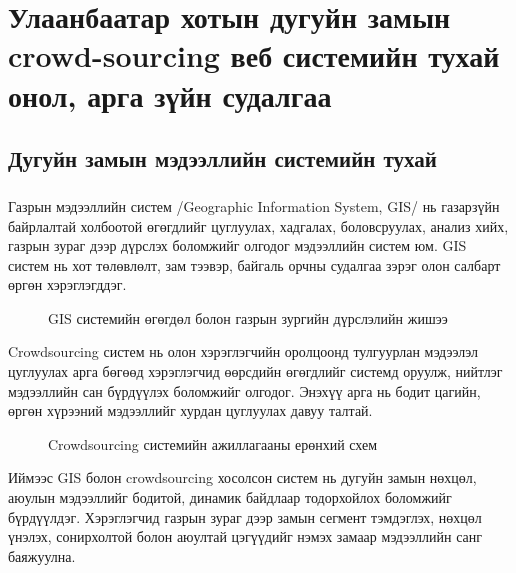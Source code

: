 \chapter{Улаанбаатар хотын дугуйн замын crowd-sourcing веб системийн тухай онол, арга зүйн судалгаа} %
\label{Chapter1} %
\newcommand{\keyword}[1]{\textbf{#1}}
\newcommand{\tabhead}[1]{\textbf{#1}}
\newcommand{\code}[1]{\texttt{#1}}
\newcommand{\file}[1]{\texttt{\bfseries#1}}
\newcommand{\option}[1]{\texttt{\itshape#1}}
\section{Дугуйн замын мэдээллийн системийн тухай}
\paragraph{}
Газрын мэдээллийн систем /Geographic Information System, GIS/ нь газарзүйн байрлалтай холбоотой өгөгдлийг цуглуулах, хадгалах, боловсруулах, анализ хийх, газрын зураг дээр дүрслэх боломжийг олгодог мэдээллийн систем юм. GIS систем нь хот төлөвлөлт, зам тээвэр, байгаль орчны судалгаа зэрэг олон салбарт өргөн хэрэглэгддэг.
\begin{figure}[H]
    \centering
    \caption{GIS системийн өгөгдөл болон газрын зургийн дүрслэлийн жишээ}
    \label{fig:gis}
\end{figure}
Crowdsourcing систем нь олон хэрэглэгчийн оролцоонд тулгуурлан мэдээлэл цуглуулах арга бөгөөд хэрэглэгчид өөрсдийн өгөгдлийг системд оруулж, нийтлэг мэдээллийн сан бүрдүүлэх боломжийг олгодог. Энэхүү арга нь бодит цагийн, өргөн хүрээний мэдээллийг хурдан цуглуулах давуу талтай.
\begin{figure}[H]
    \centering
    \caption{Crowdsourcing системийн ажиллагааны ерөнхий схем}
    \label{fig:crowd}
\end{figure}
Иймээс GIS болон crowdsourcing хосолсон систем нь дугуйн замын нөхцөл, аюулын мэдээллийг бодитой, динамик байдлаар тодорхойлох боломжийг бүрдүүлдэг. Хэрэглэгчид газрын зураг дээр замын сегмент тэмдэглэх, нөхцөл үнэлэх, сонирхолтой болон аюултай цэгүүдийг нэмэх замаар мэдээллийн санг баяжуулна.
